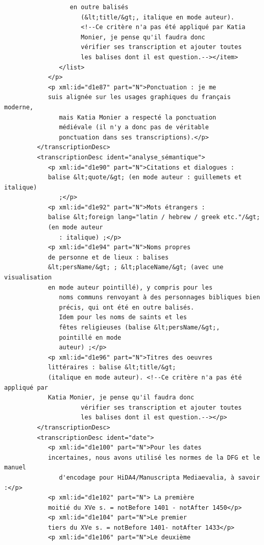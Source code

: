 \documentclass[a4paper,12pt,twoside]{book}
\begin{document}
\begin{verbatim}
                  en outre balisés
                     (&lt;title/&gt;, italique en mode auteur). 
                     <!--Ce critère n'a pas été appliqué par Katia
                     Monier, je pense qu'il faudra donc 
                     vérifier ses transcription et ajouter toutes
                     les balises dont il est question.--></item>
               </list>
            </p>
            <p xml:id="d1e87" part="N">Ponctuation : je me 
            suis alignée sur les usages graphiques du français moderne,
               mais Katia Monier a respecté la ponctuation 
               médiévale (il n'y a donc pas de véritable
               ponctuation dans ses transcriptions).</p>
         </transcriptionDesc>
         <transcriptionDesc ident="analyse_sémantique">
            <p xml:id="d1e90" part="N">Citations et dialogues : 
            balise &lt;quote/&gt; (en mode auteur : guillemets et italique)
               ;</p>
            <p xml:id="d1e92" part="N">Mots étrangers : 
            balise &lt;foreign lang="latin / hebrew / greek etc."/&gt; 
            (en mode auteur
               : italique) ;</p>
            <p xml:id="d1e94" part="N">Noms propres 
            de personne et de lieux : balises 
            &lt;persName/&gt; ; &lt;placeName/&gt; (avec une visualisation
            en mode auteur pointillé), y compris pour les 
               noms communs renvoyant à des personnages bibliques bien
               précis, qui ont été en outre balisés. 
               Idem pour les noms de saints et les 
               fêtes religieuses (balise &lt;persName/&gt;, 
               pointillé en mode
               auteur) ;</p>
            <p xml:id="d1e96" part="N">Titres des oeuvres 
            littéraires : balise &lt;title/&gt; 
            (italique en mode auteur). <!--Ce critère n'a pas été appliqué par
            Katia Monier, je pense qu'il faudra donc 
                     vérifier ses transcription et ajouter toutes
                     les balises dont il est question.--></p>
         </transcriptionDesc>
         <transcriptionDesc ident="date">
            <p xml:id="d1e100" part="N">Pour les dates 
            incertaines, nous avons utilisé les normes de la DFG et le manuel
               d'encodage pour HiDA4/Manuscripta Mediaevalia, à savoir :</p>
            <p xml:id="d1e102" part="N"> La première 
            moitié du XVe s. = notBefore 1401 - notAfter 1450</p>
            <p xml:id="d1e104" part="N">Le premier 
            tiers du XVe s. = notBefore 1401- notAfter 1433</p>
            <p xml:id="d1e106" part="N">Le deuxième 

\end{verbatim}
\end{document}
